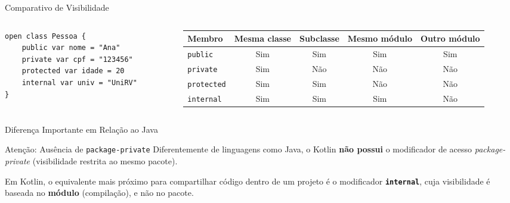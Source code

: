\documentclass[aspectratio=169]{beamer}
\begin{document}
\begin{frame}[fragile]{Comparativo de Visibilidade}
  \begin{columns}[T]
    \begin{column}{0.30\textwidth}
\begin{lstlisting}[style=KotlinStyle]
open class Pessoa {
    public var nome = "Ana"
    private var cpf = "123456"
    protected var idade = 20
    internal var univ = "UniRV"
}
\end{lstlisting}
    \end{column}
    \begin{column}{0.70\textwidth}
        \scriptsize

      \vspace{-0.5em}
      \begin{table}
        \scriptsize
        \begin{tabular}{l c c c c}
          \toprule
          \textbf{Membro} & \textbf{Mesma classe} & \textbf{Subclasse} & \textbf{Mesmo módulo} & \textbf{Outro módulo} \\
          \midrule
          \texttt{public}    & Sim & Sim & Sim & Sim \\[3pt]
          \texttt{private}   & Sim & N\~ao & N\~ao & N\~ao \\[3pt]
          \texttt{protected} & Sim & Sim & N\~ao & N\~ao \\[3pt]
          \texttt{internal}  & Sim & Sim & Sim & N\~ao \\
          \bottomrule
        \end{tabular}
      \end{table}
    \end{column}
  \end{columns}
\end{frame}

\begin{frame}{Diferença Importante em Relação ao Java}
  \begin{block}{Atenção: Ausência de \texttt{package-private}}
    \vspace{0.3em}
    Diferentemente de linguagens como Java, o Kotlin \textbf{não possui} o modificador de acesso \textit{package-private} (visibilidade restrita ao mesmo pacote).
    \vspace{0.5em}

    Em Kotlin, o equivalente mais próximo para compartilhar código dentro de um projeto é o modificador \textbf{\texttt{internal}}, cuja visibilidade é baseada no \textbf{módulo} (compilação), e não no pacote.
  \end{block}
\end{frame}
\end{document}
